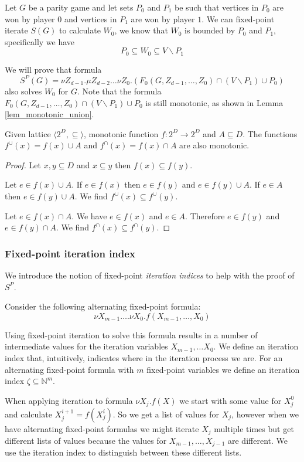 Let $G$ be a parity game and let sets $P_0$ and $P_1$ be such that vertices in $P_0$ are won by player $0$ and vertices in $P_1$ are won by player $1$. We can fixed-point iterate $S(G)$ to calculate $W_0$, we know that $W_0$ is bounded by $P_0$ and $P_1$, specifically we have
\[ P_0 \subseteq W_0 \subseteq V\backslash P_1\]

We will prove that formula 
\[ S^P(G) = \nu Z_{d-1}.\mu Z_{d-2}\dots \nu Z_0.(F_0(G,Z_{d-1},\dots,Z_0) \cap (V\backslash P_1) \cup P_0) \]
also solves $W_0$ for $G$. Note that the formula $F_0(G,Z_{d-1},\dots,Z_0) \cap (V\backslash P_1) \cup P_0$ is still monotonic, as shown in Lemma \ref{lem_monotonic_union}.
\begin{lemma}
	\label{lem_monotonic_union}
	Given lattice $\langle 2^D, \subseteq \rangle $, monotonic function $f :  2^D \rightarrow 2^D$ and $A \subseteq D$. The functions $f^\cup(x) = f(x) \cup A$ and $f^\cap(x) = f(x) \cap A$ are also monotonic.
	\begin{proof}
		Let $x,y \subseteq D$ and $x\subseteq y$ then $f(x) \subseteq f(y)$.
		
		Let $e \in f(x) \cup A$. If $e \in f(x)$ then $e \in f(y)$ and $e \in f(y) \cup A$. If $e \in A$ then $e \in f(y) \cup A$. We find $f^\cup(x) \subseteq f^\cup(y)$.
		
		Let $e \in f(x) \cap A$. We have $e \in f(x)$ and $e \in A$. Therefore $e \in f(y)$ and $e \in f(y) \cap A$. We find $f^\cap(x) \subseteq f^\cap(y)$.
	\end{proof}
\end{lemma}

\subsubsection{Fixed-point iteration index} We introduce the notion of fixed-point \textit{iteration indices} to help with the proof of $S^P$.

Consider the following alternating fixed-point formula:
\[ \nu X_{m-1}\dots.\nu X_0.f(X_{m-1},\dots,X_0) \]

Using fixed-point iteration to solve this formula results in a number of intermediate values for the iteration variables $X_{m-1},\dots X_0$. We define an iteration index that, intuitively, indicates where in the iteration process we are. For an alternating fixed-point formula with $m$ fixed-point variables we define an iteration index $\zeta \subseteq \mathbb{N}^m$.

When applying iteration to formula $\nu X_j.f(X)$ we start with some value for $X_j^0$ and calculate $X_j^{i+1} = f(X_j^{i})$. So we get a list of values for $X_j$, however when we have alternating fixed-point formulas we might iterate $X_j$ multiple times but get different lists of values because the values for $X_{m-1},\dots,X_{j-1}$ are different. We use the iteration index to distinguish between these different lists. 

